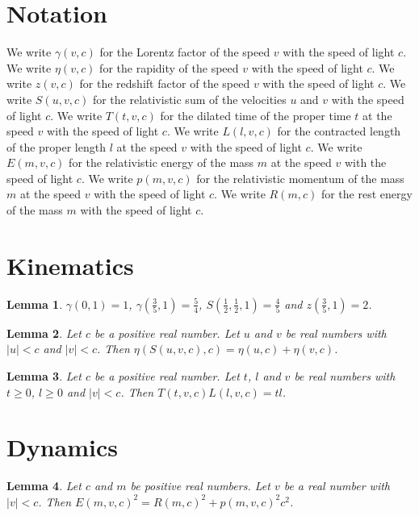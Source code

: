 \documentclass{article}
\newtheorem{lemma}{Lemma}
\begin{document}
\section{Notation}

We write $\gamma(v,c)$ for the Lorentz factor of the speed $v$ with the speed of light $c$.
We write $\eta(v,c)$ for the rapidity of the speed $v$ with the speed of light $c$.
We write $z(v,c)$ for the redshift factor of the speed $v$ with the speed of light $c$.
We write $S(u,v,c)$ for the relativistic sum of the velocities $u$ and $v$ with the speed of light $c$.
We write $T(t,v,c)$ for the dilated time of the proper time $t$ at the speed $v$ with the speed of light $c$.
We write $L(l,v,c)$ for the contracted length of the proper length $l$ at the speed $v$ with the speed of light $c$.
We write $E(m,v,c)$ for the relativistic energy of the mass $m$ at the speed $v$ with the speed of light $c$.
We write $p(m,v,c)$ for the relativistic momentum of the mass $m$ at the speed $v$ with the speed of light $c$.
We write $R(m,c)$ for the rest energy of the mass $m$ with the speed of light $c$.

\section{Kinematics}

\begin{lemma}\label{values}
$\gamma(0,1)=1$, $\gamma(\frac35,1)=\frac54$, $S(\frac12,\frac12,1)=\frac45$ and $z(\frac35,1)=2$.
\end{lemma}

\begin{lemma}\label{rapidity}
Let $c$ be a positive real number. Let $u$ and $v$ be real numbers with $|u|<c$ and $|v|<c$. Then $\eta(S(u,v,c),c)=\eta(u,c)+\eta(v,c)$.
\end{lemma}

\begin{lemma}\label{dilation}
Let $c$ be a positive real number. Let $t$, $l$ and $v$ be real numbers with $t\ge0$, $l\ge0$ and $|v|<c$. Then $T(t,v,c)L(l,v,c)=tl$.
\end{lemma}

\section{Dynamics}

\begin{lemma}\label{energy}
Let $c$ and $m$ be positive real numbers. Let $v$ be a real number with $|v|<c$. Then $E(m,v,c)^2=R(m,c)^2+p(m,v,c)^2c^2$.
\end{lemma}
\end{document}
